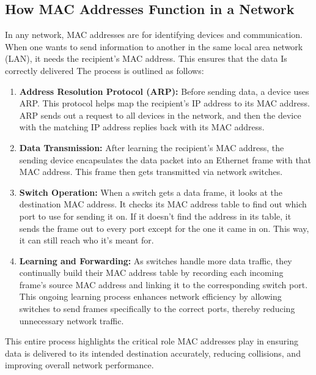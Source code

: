 \documentclass[11pt,a4paper]{article}
\begin{document}
\subsection*{How MAC Addresses Function in a Network}

In any network, MAC addresses are for identifying devices and communication. When one wants to send information to another in the same local area network (LAN), it needs the recipient's MAC address. This ensures that the data Is correctly delivered The process is outlined as follows:

\begin{enumerate}
    
    \item \textbf{Address Resolution Protocol (ARP):} Before sending data, a device uses ARP. This protocol helps map the recipient's IP address to its MAC address. ARP sends out a request to all devices in the network, and then the device with the matching IP address replies back with its MAC address.

    \item \textbf{Data Transmission:} After learning the recipient’s MAC address, the sending device encapsulates the data packet into an Ethernet frame with that MAC address. This frame then gets transmitted via network switches.

    \item \textbf{Switch Operation:} When a switch gets a data frame, it looks at the destination MAC address. It checks its MAC address table to find out which port to use for sending it on. If it doesn't find the address in its table, it sends the frame out to every port except for the one it came in on. This way, it can still reach who it's meant for.


    \item \textbf{Learning and Forwarding:} As switches handle more data traffic, they continually build their MAC address table by recording each incoming frame’s source MAC address and linking it to the corresponding switch port. This ongoing learning process enhances network efficiency by allowing switches to send frames specifically to the correct ports, thereby reducing unnecessary network traffic.

\end{enumerate}

This entire process highlights the critical role MAC addresses play in ensuring data is delivered to its intended destination accurately, reducing collisions, and improving overall network performance.
\end{document}
